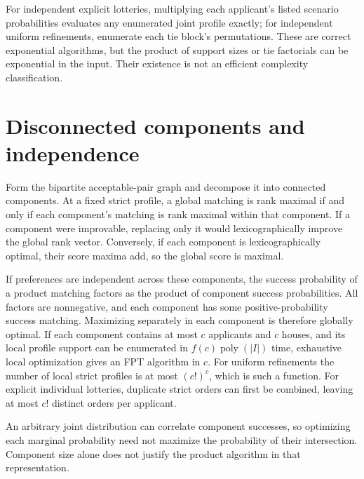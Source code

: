 \documentclass[11pt]{article}
\begin{document}
For independent explicit lotteries, multiplying each applicant's listed scenario probabilities evaluates any enumerated joint profile exactly; for independent uniform refinements, enumerate each tie block's permutations. These are correct exponential algorithms, but the product of support sizes or tie factorials can be exponential in the input. Their existence is not an efficient complexity classification.

\section*{Disconnected components and independence}
Form the bipartite acceptable-pair graph and decompose it into connected components. At a fixed strict profile, a global matching is rank maximal if and only if each component's matching is rank maximal within that component. If a component were improvable, replacing only it would lexicographically improve the global rank vector. Conversely, if each component is lexicographically optimal, their score maxima add, so the global score is maximal.

If preferences are independent across these components, the success probability of a product matching factors as the product of component success probabilities. All factors are nonnegative, and each component has some positive-probability success matching. Maximizing separately in each component is therefore globally optimal. If each component contains at most $c$ applicants and $c$ houses, and its local profile support can be enumerated in $f(c)\operatorname{poly}(|I|)$ time, exhaustive local optimization gives an FPT algorithm in $c$. For uniform refinements the number of local strict profiles is at most $(c!)^c$, which is such a function. For explicit individual lotteries, duplicate strict orders can first be combined, leaving at most $c!$ distinct orders per applicant.

An arbitrary joint distribution can correlate component successes, so optimizing each marginal probability need not maximize the probability of their intersection. Component size alone does not justify the product algorithm in that representation.
\end{document}
